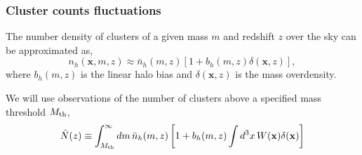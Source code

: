 \documentclass[preprint]{aastex}
\newcommand{\xv}{\mathbf{x}}
\newcommand{\nbar}{\bar{n}}
\newcommand{\mth}{M_{\rm th}}
\begin{document}
\subsubsection{Cluster counts fluctuations}
The number density of clusters of a given mass $m$ and redshift $z$ over the 
sky can be approximated as,
\begin{equation}
	n_{h}(\xv, m, z) \approx \nbar_{h}(m, z)
	\left[1 + b_{h}(m,z) \delta(\xv, z)\right],
\end{equation}
where $b_{h}(m,z)$ is the linear halo bias and
$\delta(\xv,z)$ is the mass overdensity.

We will use observations of the number of clusters above a 
specified mass threshold $\mth$,
\begin{equation}
	\bar{N}(z) \equiv
	\int_{\mth}^{\infty} dm\, 
	\nbar_{h}(m,z)
	\left[
	1 + b_{h}(m,z)
	\int d^{3}x\, W(\xv) \delta(\xv)
	\right]
\end{equation}




\end{document}
